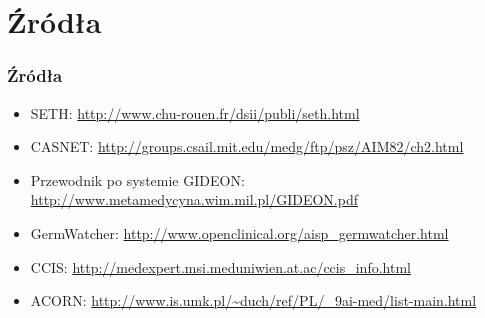 \section{Źródła}

\begin{frame}
    \frametitle{Źródła}
    \begin{itemize}
        \item SETH: \url{http://www.chu-rouen.fr/dsii/publi/seth.html}
        \item CASNET: \url{http://groups.csail.mit.edu/medg/ftp/psz/AIM82/ch2.html}
        \item Przewodnik po systemie GIDEON:
        \url{http://www.metamedycyna.wim.mil.pl/GIDEON.pdf}
        \item GermWatcher: \url{http://www.openclinical.org/aisp_germwatcher.html}
        \item CCIS: \url{http://medexpert.msi.meduniwien.at.ac/ccis_info.html}
        \item ACORN: \url{http://www.is.umk.pl/~duch/ref/PL/_9ai-med/list-main.html}
    \end{itemize}
\end{frame}

